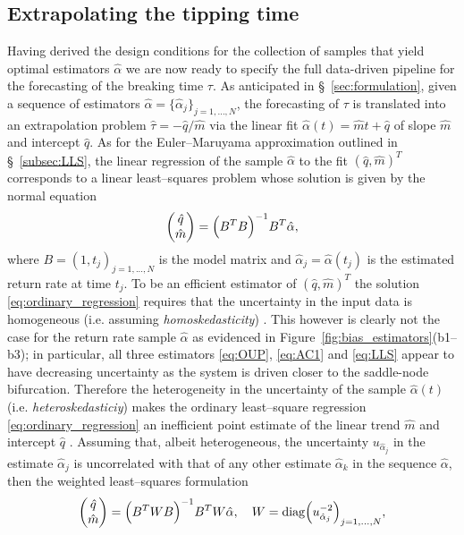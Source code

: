 \documentclass[openacc]{rsproca_new}
\begin{document}
\subsection{Extrapolating the tipping time}\label{subsec:extrapolators}
Having derived the design conditions for the collection of samples that yield optimal estimators $\hat\alpha$ we are now ready to specify the full data-driven pipeline for the forecasting of the breaking time $\tau$.
As anticipated in \S~\ref{sec:formulation}, given a sequence of estimators $\hat\alpha=\{\hat\alpha_j\}_{j=1,\dots,N}$, the forecasting of $\tau$ is translated into an extrapolation problem $\hat\tau = -\hat q/\hat m$ via the linear fit $\hat\alpha(t)=\hat m t + \hat q$ of slope $\hat m$ and intercept $\hat q$.
As for the Euler--Maruyama approximation outlined in \S~\ref{subsec:LLS}, the linear regression of the sample $\hat\alpha$ to the fit $(\hat q,\hat m)^T$ corresponds to a linear least--squares problem whose solution is given by the normal equation 
%
\begin{equation}\label{eq:ordinary_regression}
  \begin{pmatrix}
       \hat q \\
       \hat m
     \end{pmatrix} = \Bigl(B^TB\Bigr)^{-1}B^T\hat\alpha,
\end{equation}
%
where $B = (1, t_j)_{j=1,...,N}$ is the model matrix and $\hat\alpha_j=\hat\alpha(t_j)$ is the estimated return rate at time $t_j$.
To be an efficient estimator of $(\hat q,\hat m)^T$ the solution \eqref{eq:ordinary_regression} requires that the uncertainty in the input data is homogeneous (i.e. assuming \emph{homoskedasticity}) .
This however is clearly not the case for the return rate sample $\hat\alpha$ as evidenced in Figure~\ref{fig:bias_estimators}(b1--b3); in particular, all three estimators \eqref{eq:OUP}, \eqref{eq:AC1} and \eqref{eq:LLS} appear to have decreasing uncertainty as the system is driven closer to the saddle-node bifurcation.
Therefore the heterogeneity in the uncertainty of the sample $\hat\alpha(t)$ (i.e. \emph{heteroskedasticiy}) makes the ordinary least--square regression \eqref{eq:ordinary_regression} an inefficient point estimate of the linear trend $\hat m$ and intercept $\hat q$ \cite{White1980}.
Assuming that, albeit heterogeneous, the uncertainty $u_{\hat\alpha_j}$ in the estimate $\hat\alpha_j$ is uncorrelated with that of any other estimate $\hat \alpha_k$ in the sequence $\hat\alpha$, then the weighted least--squares formulation
%
\begin{equation}\label{eq:weighted_regression}
  \begin{pmatrix}
       \hat q \\
       \hat m
     \end{pmatrix} = \Bigl(B^TWB\Bigr)^{-1}B^TW\hat\alpha,\quad W = \mathrm{diag}\Bigl(u^{-2}_{\hat\alpha_j}\Bigr)_{j=1,\dots,N},
\end{equation}
\end{document}
